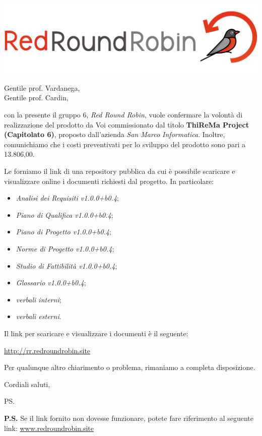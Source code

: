 \documentclass[12pt]{letter}
\date{14 gennaio 2020}
\begin{document}
\begin{letter}{ }

\includegraphics[scale=0.17]{images/logo.png}

\opening{Gentile prof. Vardanega,\\ Gentile prof. Cardin, }

con la presente il gruppo 6, \textit{Red Round Robin}, vuole confermare la volontà di realizzazione del prodotto da Voi commissionato dal titolo 
\textbf{ThiReMa Project (Capitolato 6)}, proposto dall'azienda \textit{San Marco Informatica}. Inoltre, comunichiamo che i costi preventivati per lo sviluppo del prodotto sono pari a \EUR{}13.806,00.

Le forniamo il link di una repository pubblica da cui è possibile scaricare e visualizzare online i documenti richiesti dal progetto.
In particolare:

\begin{itemize}
	\item \textit{Analisi dei Requisiti v1.0.0+b0.4};
	\item \textit{Piano di Qualifica v1.0.0+b0.4};
	\item \textit{Piano di Progetto v1.0.0+b0.4};
	\item \textit{Norme di Progetto v1.0.0+b0.4};
	\item \textit{Studio di Fattibilità v1.0.0+b0.4};
	\item \textit{Glossario v1.0.0+b0.4};
	\item \textit{verbali interni};
	\item \textit{verbali esterni}.
\end{itemize}

Il link per scaricare e visualizzare i documenti è il seguente:

\begin{center}
\href{https://drive.google.com/open?id=17qt131a_wV08n1jLR0fiSS8FoROeKiSY}{http://rr.redroundrobin.site}
\end{center}

\newpage

Per qualunque altro chiarimento o problema, rimaniamo a completa disposizione.

\closing{Cordiali saluti,}


\vspace{3em}
\ps 

\textbf{P.S.} Se il link fornito non dovesse funzionare, potete fare riferimento al seguente link: 
\href{https://www.redroundrobin.site}{www.redroundrobin.site}

\end{letter}
\end{document}
